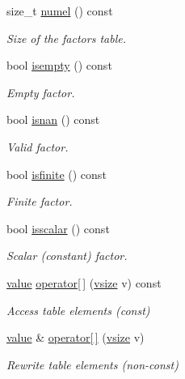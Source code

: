 \begin{DoxyCompactItemize}
size\+\_\+t \hyperlink{classmerlin_1_1factor_ae9e7bb70155b3501bcf646682353599c}{numel} () const 
\begin{DoxyCompactList}\small\item\em Size of the factor\textquotesingle{}s table. \end{DoxyCompactList}\item 
bool \hyperlink{classmerlin_1_1factor_a05775f08c20f1dcdd861e70a43250310}{isempty} () const 
\begin{DoxyCompactList}\small\item\em Empty factor. \end{DoxyCompactList}\item 
bool \hyperlink{classmerlin_1_1factor_a8b28a4064ee7ebe7dfcafbd6ac89b8b2}{isnan} () const 
\begin{DoxyCompactList}\small\item\em Valid factor. \end{DoxyCompactList}\item 
bool \hyperlink{classmerlin_1_1factor_aeabe083fec878890b7395f87fa49430d}{isfinite} () const 
\begin{DoxyCompactList}\small\item\em Finite factor. \end{DoxyCompactList}\item 
bool \hyperlink{classmerlin_1_1factor_aea3f8cbd769560e741e1e74b18edbe47}{isscalar} () const 
\begin{DoxyCompactList}\small\item\em Scalar (constant) factor. \end{DoxyCompactList}\item 
\hyperlink{classmerlin_1_1factor_a1b14d19e509403448fbef26b003c9281}{value} \hyperlink{classmerlin_1_1factor_a7664043144cceef5e9e61c0d6a9700fc}{operator\mbox{[}$\,$\mbox{]}} (\hyperlink{classmerlin_1_1factor_a31de8d8d0c43cc33dc3874408e75b0fc}{vsize} v) const 
\begin{DoxyCompactList}\small\item\em Access table elements (const) \end{DoxyCompactList}\item 
\hyperlink{classmerlin_1_1factor_a1b14d19e509403448fbef26b003c9281}{value} \& \hyperlink{classmerlin_1_1factor_a36730193348313ac750b389822910a98}{operator\mbox{[}$\,$\mbox{]}} (\hyperlink{classmerlin_1_1factor_a31de8d8d0c43cc33dc3874408e75b0fc}{vsize} v)
\begin{DoxyCompactList}\small\item\em Rewrite table elements (non-\/const) \end{DoxyCompactList}\item 

\end{DoxyCompactItemize}

